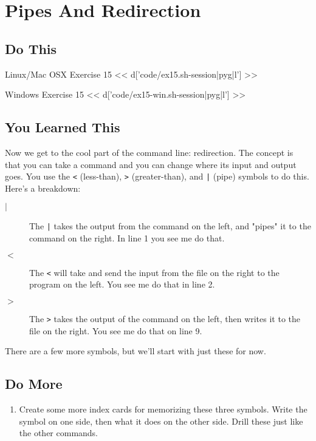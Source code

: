 \chapter{Pipes And Redirection}

\section{Do This}

\begin{code}{Linux/Mac OSX Exercise 15}
<< d['code/ex15.sh-session|pyg|l'] >>
\end{code}

\begin{code}{Windows Exercise 15}
<< d['code/ex15-win.sh-session|pyg|l'] >>
\end{code}

\section{You Learned This}

Now we get to the cool part of the command line: redirection.  The concept is
that you can take a command and you can change where its input and output goes. 
You use the \verb|<| (less-than), \verb|>| (greater-than), and \verb,|, (pipe) 
symbols to do this.  Here's a breakdown:

\begin{description}
\item[$|$] The \verb,|, takes the output from the command on the left, and "pipes" it to the command on the right.  In line 1 you see me do that.
\item[$<$] The \verb|<| will take and send the input from the file on the right to the program on the left.  You see me do that in line 2.
\item[$>$] The \verb|>| takes the output of the command on the left, then writes it
    to the file on the right.  You see me do that on line 9.
\end{description}

There are a few more symbols, but we'll start with just these for now.

\section{Do More}

\begin{enumerate}
\item Create some more index cards for memorizing these three symbols.  Write the symbol on one side, then what it does on the other side.  Drill these just like the other commands.
\end{enumerate}

